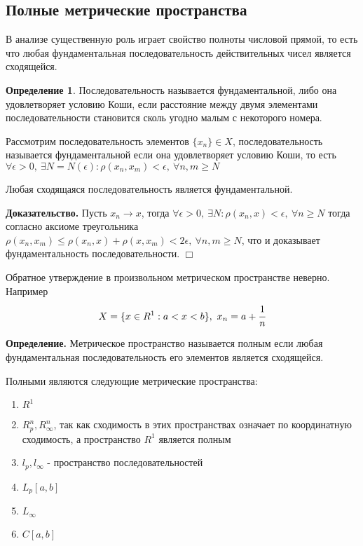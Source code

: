 \documentclass[14pt,a4paper]{extarticle}
\theoremstyle{definition}
\newtheorem{definition}{Определение}[section]
\theoremstyle{remark}
\newcommand{\sep}{ , \ \allowbreak }
\renewcommand{\[}{\begin{dmath*}[compact]}
\renewcommand{\]}{\end{dmath*}}
\newcommand{\tdef}{\textbf{Определение.} }
\newcommand{\btev}[1][]{\textbf{Доказательство#1.}
}
\newcommand{\etev}{$\Box$}
\begin{document}
\subsection{Полные метрические пространства}

В анализе существенную роль играет свойство полноты числовой прямой, то есть
что любая фундаментальная последовательность действительных чисел является
сходящейся.

\begin{definition}
  Последовательность называется фундаментальной, либо она удовлетворяет условию Коши,
  если расстояние между двумя элементами последовательности становится сколь
  угодно малым с некоторого номера.
\end{definition}

Рассмотрим последовательность элементов $\{x_n\} \in X$, последовательность
называется фундаментальной если она удовлетворяет условию Коши, то есть
$ \forall \epsilon > 0 \sep \exists N = N(\epsilon): \rho(x_n, x_m) < \epsilon
\sep \forall n, m \geq N $

Любая сходящаяся последовательность является фундаментальной.

\btev[] Пусть $x_n \to x$, тогда
$\forall \epsilon > 0 \sep \exists N: \rho(x_n, x) < \epsilon \sep
\forall n \geq N$
тогда согласно аксиоме треугольника
$\rho(x_n, x_m) \leq \rho(x_n, x)+\rho(x, x_m) < 2\epsilon \sep
\forall n, m \geq N$,
что и доказывает фундаментальность последовательности. \etev

Обратное утверждение в произвольном метрическом пространстве неверно.
Например \[ {X = \{x \in R^1: a < x < b\}} \sep {x_n = a + \cfrac{1}{n}}\]

\tdef Метрическое пространство называется полным если любая
фундаментальная последовательность его элементов является сходящейся.

Полными являются следующие метрические пространства:

\begin{enumerate}
  \item $R^1$
  \item $R_p^n, R_\infty^n$, так как сходимость в этих пространствах означает
  по координатную сходимость, а пространство $R^1$ является полным
  \item $l_p, l_\infty$ - пространство последовательностей
  \item $L_p[a,b]$
  \item $L_\infty$
  \item $C[a,b]$
\end{enumerate}
\end{document}
